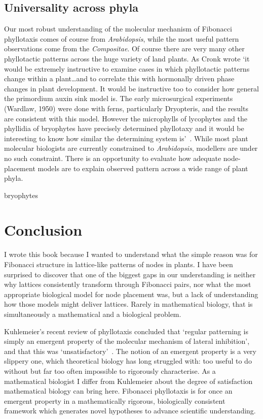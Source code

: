 \subsection{Universality across phyla}
Our most robust understanding of the molecular mechanism of Fibonacci phyllotaxis comes of course from \textit{Arabidopsis}, while the most useful pattern observations come from the \textit{Compositae}. Of course there are very many other phyllotactic patterns across the huge variety of land plants. As Cronk wrote `it would be extremely instructive to examine cases in which phyllotactic patterns change within a plant\ldots and to correlate this with hormonally driven phase changes in plant development. It would be instructive too to consider how general the primordium auxin sink model is. The early microsurgical experiments (Wardlaw, 1950) were done with ferns, particularly Dryopteris, and the results are consistent with this model. However the microphylls of lycophytes and the phyllidia of bryophytes have precisely determined phyllotaxy and it would be interesting to know how similar the determining system is'~\autocite[p120]{cronkMolecularOrganographyPlants2009}. 
While most plant molecular biologists are currently constrained to \textit{Arabidopsis}, modellers are under no such constraint.
There is an opportunity to evaluate how adequate node-placement models are to explain observed pattern  across a wide range of plant phyla.

bryophytes~\cite{gomez-campoPhyllotacticPatternsBryophyllum1974}
\section{Conclusion}
I wrote this book because I wanted to understand what the simple reason was for Fibonacci structure in lattice-like patterns of nodes in plants. I have been surprised to discover that one of the biggest gaps in our understanding is neither why lattices consistently transform through Fibonacci pairs, nor what the most appropriate biological model for node placement was, but a lack of understanding how those models might deliver lattices. Rarely in mathematical biology, that is simultaneously a mathematical and a biological problem. 

Kuhlemeier's recent review of phyllotaxis concluded  that `regular patterning is simply an emergent property of the molecular mechanism of lateral inhibition', and that this was  `unsatisfactory'~\autocite{kuhlemeierPhyllotaxis2017}. 
The notion of an emergent property is a very slippery one, which theoretical biology has long struggled with: too useful to do without but far too often impossible to rigorously characterise. As a mathematical biologist I differ from Kuhlemeier about the degree of satisfaction mathematical biology can bring here. Fibonacci phyllotaxis is for once an emergent property in a mathematically rigorous, biologically consistent framework which generates novel hypotheses to advance scientific understanding. 

